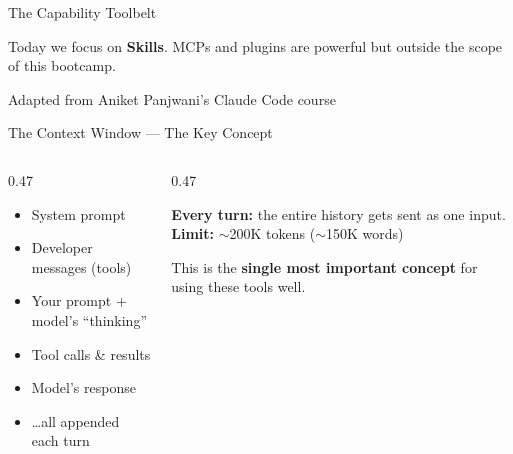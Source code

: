 \documentclass[aspectratio=169, 10pt]{beamer}
\begin{document}
\begin{frame}[fragile]{The Capability Toolbelt}
\vskip6pt
\pause
\begin{tcolorbox}[quotebox, width=10cm]
\scriptsize Today we focus on \textbf{Skills}. MCPs and plugins are powerful but outside the scope of this bootcamp.
\end{tcolorbox}
\vskip1pt
{\tiny\color{CoolGray} Adapted from Aniket Panjwani's Claude Code course}
\end{frame}

\begin{frame}{The Context Window --- The Key Concept}
\begin{columns}[T]
\begin{column}{0.47\textwidth}
\begin{tcolorbox}[keybox, title={What the model ``sees''}]
\scriptsize
\begin{itemize}\setlength{\itemsep}{0pt}
  \item System prompt
  \item Developer messages (tools)
  \item Your prompt + model's ``thinking''
  \item Tool calls \& results
  \item Model's response
  \item \ldots all appended each turn
\end{itemize}
\end{tcolorbox}
\end{column}
\begin{column}{0.47\textwidth}
\begin{tcolorbox}[accentbox]
\scriptsize
\textbf{Every turn:} the entire history gets sent as one input.
\vskip4pt
\textbf{Limit:} $\sim$200K tokens ($\sim$150K words)
\end{tcolorbox}
\vskip4pt
\pause
\begin{tcolorbox}[colback=SoftCoral!8, colframe=SoftCoral, boxrule=0.5pt, left=5pt, right=5pt, top=3pt, bottom=3pt]
\centering\scriptsize
This is the \textbf{single most important concept} for using these tools well.
\end{tcolorbox}
\end{column}
\end{columns}
\end{frame}
\end{document}

